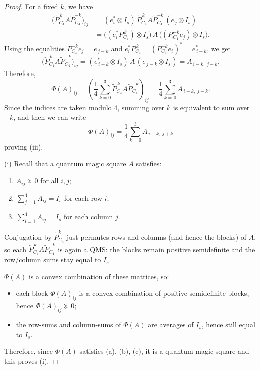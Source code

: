 \documentclass[10pt,a4paper]{amsart}
\begin{document}
\begin{proof}
For a fixed \(k\), we have
\begin{align*}
\bigl(\widetilde P_{C_4}^{\,k} A \widetilde P_{C_4}^{-k}\bigr)_{ij}
&= (e_i^*\otimes I_s)\, \widetilde P_{C_4}^{\,k} A \widetilde P_{C_4}^{-k}\, (e_j\otimes I_s) \\
&= \bigl((e_i^* P_{C_4}^{\,k})\otimes I_s\bigr)\, A \,
   \bigl((P_{C_4}^{-k} e_j)\otimes I_s\bigr).
\end{align*}
Using the equalities \(P_{C_4}^{-k}e_j=e_{\,j-k}\) and
\(e_i^* P_{C_4}^{\,k} = (P_{C_4}^{-k}e_i)^* = e_{\,i-k}^*\), we get
\[
\bigl(\widetilde P_{C_4}^{\,k} A \widetilde P_{C_4}^{-k}\bigr)_{ij}
= (e_{\,i-k}^* \otimes I_s)\, A\, (e_{\,j-k}\otimes I_s)
= A_{\,i-k,\; j-k}.
\]
Therefore,
\[
\Phi(A)_{ij}
= \left(\frac14 \sum_{k=0}^3 \widetilde P_{C_4}^{\,k} A \widetilde P_{C_4}^{-k}\right)_{ij}
= \frac14 \sum_{k=0}^3 A_{\,i-k,\; j-k}.
\]
Since the indices are taken modulo \(4\), summing over \(k\) is equivalent to sum over \(-k\), and then we can write
\[
\Phi(A)_{ij}
= \frac14 \sum_{k=0}^3 A_{\,i+k,\; j+k}
\]
proving (iii).

\smallskip

(i)
Recall that a quantum magic square \(A\) satisfies:
\begin{enumerate}
\item[(a)] \(A_{ij} \succeq 0\) for all \(i,j\);
\item[(b)] \(\sum_{j=1}^4 A_{ij} = I_s\) for each row \(i\);
\item[(c)] \(\sum_{i=1}^4 A_{ij} = I_s\) for each column \(j\).
\end{enumerate}
Conjugation by \(\widetilde P_{C_4}^k\) just permutes rows and columns (and hence the
blocks) of \(A\), so each \(\widetilde P_{C_4}^{\,k} A \widetilde P_{C_4}^{-k}\) is again a QMS:
the blocks remain positive semidefinite and the row/column sums stay equal to \(I_s\).

\(\Phi(A)\) is a convex combination of these matrices, so:
\begin{itemize}
\item each block \(\Phi(A)_{ij}\) is a convex combination of positive semidefinite blocks, hence \(\Phi(A)_{ij}\succeq 0\);
\item the row-sums and column-sums of \(\Phi(A)\) are averages of \(I_s\), hence still equal to \(I_s\).
\end{itemize}
Therefore, since \(\Phi(A)\) satisfies (a), (b), (c), it is a quantum magic square and this proves (i).
\end{proof}
\end{document}
